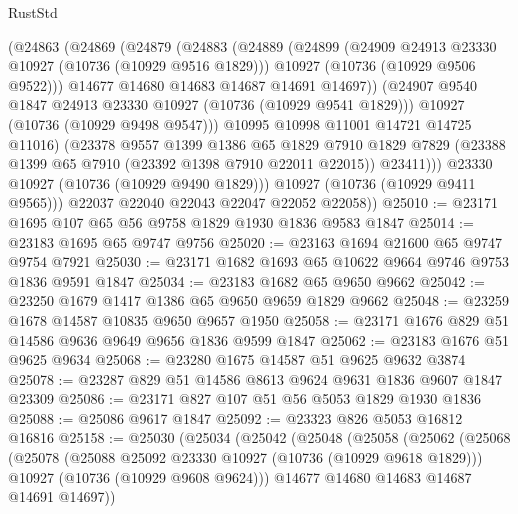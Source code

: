 \begin{lexlean}{RustStd}
\begin{coremodule}
              (@24863
                (@24869
                  (@24879
                    (@24883
                      (@24889
                        (@24899
                          (@24909 @24913 @23330 @10927 (@10736 (@10929 @9516 @1829)))
                          @10927
                          (@10736 (@10929 @9506 @9522)))
                        @14677
                        @14680
                        @14683
                        @14687
                        @14691
                        @14697))
                    (@24907 @9540 @1847 @24913 @23330 @10927 (@10736 (@10929 @9541 @1829)))
                    @10927
                    (@10736 (@10929 @9498 @9547)))
                  @10995
                  @10998
                  @11001
                  @14721
                  @14725
                  @11016)
                (@23378
                  @9557
                  @1399
                  @1386
                  @65
                  @1829
                  @7910
                  @1829
                  @7829
                  (@23388 @1399 @65 @7910 (@23392 @1398 @7910 @22011 @22015))
                  @23411)))
            @23330
            @10927
            (@10736 (@10929 @9490 @1829)))
          @10927
          (@10736 (@10929 @9411 @9565)))
        @22037
        @22040
        @22043
        @22047
        @22052
        @22058))
@25010 := @23171 @1695 @107 @65 @56 @9758 @1829 @1930 @1836 @9583 @1847
@25014 := @23183 @1695 @65 @9747 @9756
@25020 := @23163 @1694 @21600 @65 @9747 @9754 @7921
@25030 := @23171 @1682 @1693 @65 @10622 @9664 @9746 @9753 @1836 @9591 @1847
@25034 := @23183 @1682 @65 @9650 @9662
@25042 := @23250 @1679 @1417 @1386 @65 @9650 @9659 @1829 @9662
@25048 := @23259 @1678 @14587 @10835 @9650 @9657 @1950
@25058 := @23171 @1676 @829 @51 @14586 @9636 @9649 @9656 @1836 @9599 @1847
@25062 := @23183 @1676 @51 @9625 @9634
@25068 := @23280 @1675 @14587 @51 @9625 @9632 @3874
@25078 := @23287 @829 @51 @14586 @8613 @9624 @9631 @1836 @9607 @1847 @23309
@25086 := @23171 @827 @107 @51 @56 @5053 @1829 @1930 @1836
@25088 := @25086 @9617 @1847
@25092 := @23323 @826 @5053 @16812 @16816
@25158 := @25030
    (@25034
      (@25042
        (@25048
          (@25058
            (@25062
              (@25068
                (@25078
                  (@25088 @25092 @23330 @10927 (@10736 (@10929 @9618 @1829)))
                  @10927
                  (@10736 (@10929 @9608 @9624)))
                @14677
                @14680
                @14683
                @14687
                @14691
                @14697))

\end{coremodule}
\end{lexlean}
